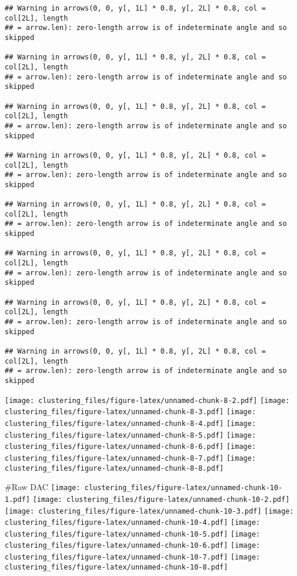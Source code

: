 \documentclass[]{article}
\begin{document}
\begin{verbatim}
## Warning in arrows(0, 0, y[, 1L] * 0.8, y[, 2L] * 0.8, col = col[2L], length
## = arrow.len): zero-length arrow is of indeterminate angle and so skipped

## Warning in arrows(0, 0, y[, 1L] * 0.8, y[, 2L] * 0.8, col = col[2L], length
## = arrow.len): zero-length arrow is of indeterminate angle and so skipped

## Warning in arrows(0, 0, y[, 1L] * 0.8, y[, 2L] * 0.8, col = col[2L], length
## = arrow.len): zero-length arrow is of indeterminate angle and so skipped

## Warning in arrows(0, 0, y[, 1L] * 0.8, y[, 2L] * 0.8, col = col[2L], length
## = arrow.len): zero-length arrow is of indeterminate angle and so skipped

## Warning in arrows(0, 0, y[, 1L] * 0.8, y[, 2L] * 0.8, col = col[2L], length
## = arrow.len): zero-length arrow is of indeterminate angle and so skipped

## Warning in arrows(0, 0, y[, 1L] * 0.8, y[, 2L] * 0.8, col = col[2L], length
## = arrow.len): zero-length arrow is of indeterminate angle and so skipped

## Warning in arrows(0, 0, y[, 1L] * 0.8, y[, 2L] * 0.8, col = col[2L], length
## = arrow.len): zero-length arrow is of indeterminate angle and so skipped

## Warning in arrows(0, 0, y[, 1L] * 0.8, y[, 2L] * 0.8, col = col[2L], length
## = arrow.len): zero-length arrow is of indeterminate angle and so skipped
\end{verbatim}

\texttt{[image: clustering\_files/figure-latex/unnamed-chunk-8-2.pdf]}
\texttt{[image: clustering\_files/figure-latex/unnamed-chunk-8-3.pdf]}
\texttt{[image: clustering\_files/figure-latex/unnamed-chunk-8-4.pdf]}
\texttt{[image: clustering\_files/figure-latex/unnamed-chunk-8-5.pdf]}
\texttt{[image: clustering\_files/figure-latex/unnamed-chunk-8-6.pdf]}
\texttt{[image: clustering\_files/figure-latex/unnamed-chunk-8-7.pdf]}
\texttt{[image: clustering\_files/figure-latex/unnamed-chunk-8-8.pdf]}

\#Raw DAC
\texttt{[image: clustering\_files/figure-latex/unnamed-chunk-10-1.pdf]}
\texttt{[image: clustering\_files/figure-latex/unnamed-chunk-10-2.pdf]}
\texttt{[image: clustering\_files/figure-latex/unnamed-chunk-10-3.pdf]}
\texttt{[image: clustering\_files/figure-latex/unnamed-chunk-10-4.pdf]}
\texttt{[image: clustering\_files/figure-latex/unnamed-chunk-10-5.pdf]}
\texttt{[image: clustering\_files/figure-latex/unnamed-chunk-10-6.pdf]}
\texttt{[image: clustering\_files/figure-latex/unnamed-chunk-10-7.pdf]}
\texttt{[image: clustering\_files/figure-latex/unnamed-chunk-10-8.pdf]}
\end{document}
